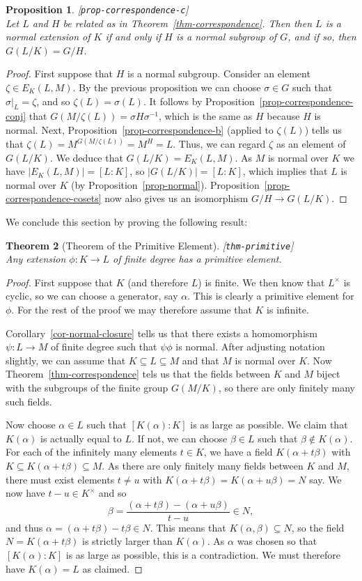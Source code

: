 \documentclass{amsart}
\newcommand{\lbl}[1]{\label{#1}\textup{[\texttt{#1}]}\ \\}
\newcommand{\lbl}{\label}
\newcommand{\al}        {\alpha}
\newcommand{\bt}        {\beta}
\newcommand{\zt}        {\zeta}
\newcommand{\sg}        {\sigma}
\newcommand{\tm}        {\times}
\newcommand{\sse}       {\subseteq}
\renewcommand{\:}{\colon}
\newtheorem{theorem}{Theorem}[section]
\newtheorem{proposition}[theorem]{Proposition}
\theoremstyle{definition}
\begin{document}
\begin{proposition}\lbl{prop-correspondence-c}
 Let $L$ and $H$ be related as in Theorem~\ref{thm-correspondence}.
 Then then $L$ is a normal extension of $K$ if and only if $H$ is a
 normal subgroup of $G$, and if so, then $G(L/K)=G/H$.
\end{proposition}
\begin{proof}
 First suppose that $H$ is a normal subgroup.  Consider an element
 $\zt\in E_K(L,M)$.  By the previous proposition we can choose
 $\sg\in G$ such that $\sg|_L=\zt$, and so $\zt(L)=\sg(L)$.  It
 follows by Proposition~\ref{prop-correspondence-conj} that
 $G(M/\zt(L))=\sg H\sg^{-1}$, which is the same as $H$ because $H$ is
 normal.  Next, Proposition~\ref{prop-correspondence-b} (applied to
 $\zt(L)$) tells us that $\zt(L)=M^{G(M/\zt(L))}=M^H=L$.  Thus, we can
 regard $\zt$ as an element of $G(L/K)$.  We deduce that
 $G(L/K)=E_K(L,M)$.  As $M$ is normal over $K$ we have
 $|E_K(L,M)|=[L:K]$, so $|G(L/K)|=[L:K]$, which implies that $L$ is
 normal over $K$ (by Proposition~\ref{prop-normal}).
 Proposition~\ref{prop-correspondence-cosets} now also gives us an
 isomorphism $G/H\to G(L/K)$. 
\end{proof}

We conclude this section by proving the following result:
\begin{theorem}[Theorem of the Primitive Element]\lbl{thm-primitive}
 Any extension $\phi\:K\to L$ of finite degree has a primitive
 element.  
\end{theorem}
\begin{proof}
 First suppose that $K$ (and therefore $L$) is finite.  We then know
 that $L^\tm$ is cyclic, so we can choose a generator, say $\al$.
 This is clearly a primitive element for $\phi$.  For the rest of the
 proof we may therefore assume that $K$ is infinite.

 Corollary~\ref{cor-normal-closure} tells us that there exists a
 homomorphism $\psi\:L\to M$ of finite degree such that $\psi\phi$ is
 normal.  After adjusting notation slightly, we can assume that
 $K\sse L\sse M$ and that $M$ is normal over $K$.  Now
 Theorem~\ref{thm-correspondence} tels us that the fields between $K$
 and $M$ biject with the subgroups of the finite group $G(M/K)$, so
 there are only finitely many such fields.  

 Now choose $\al\in L$ such that $[K(\al):K]$ is as large as
 possible.  We claim that $K(\al)$ is actually equal to $L$.  If not,
 we can choose $\bt\in L$ such that $\bt\not\in K(\al)$.  For each of
 the infinitely many elements $t\in K$, we have a field $K(\al+t\bt)$
 with $K\sse K(\al+t\bt)\sse M$.  As there are only finitely many
 fields between $K$ and $M$, there must exist elements $t\neq u$ with
 $K(\al+t\bt)=K(\al+u\bt)=N$ say.  We now have $t-u\in K^\tm$ and so 
 \[ \bt = \frac{(\al+t\bt)-(\al+u\bt)}{t-u} \in N, \]
 and thus $\al=(\al+t\bt)-t\bt\in N$.  This means that
 $K(\al,\bt)\sse N$, so the field $N=K(\al+t\bt)$ is strictly larger
 than $K(\al)$.  As $\al$ was chosen so that $[K(\al):K]$ is as large
 as possible, this is a contradiction.  We must therefore have
 $K(\al)=L$ as claimed.
\end{proof}
\end{document}
